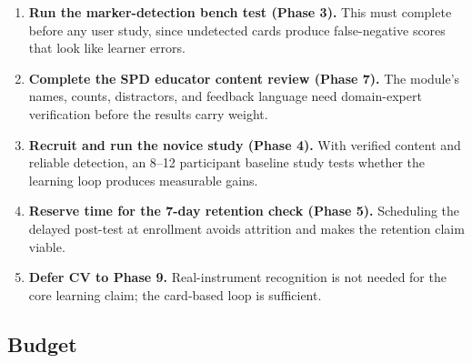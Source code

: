 \documentclass[10pt,a4paper]{article}
\begin{document}
\begin{enumerate}
  \item \textbf{Run the marker-detection bench test (Phase 3).} This must complete before any user study, since undetected cards produce false-negative scores that look like learner errors.
  \item \textbf{Complete the SPD educator content review (Phase 7).} The module's names, counts, distractors, and feedback language need domain-expert verification before the results carry weight.
  \item \textbf{Recruit and run the novice study (Phase 4).} With verified content and reliable detection, an 8--12 participant baseline study tests whether the learning loop produces measurable gains.
  \item \textbf{Reserve time for the 7-day retention check (Phase 5).} Scheduling the delayed post-test at enrollment avoids attrition and makes the retention claim viable.
  \item \textbf{Defer CV to Phase 9.} Real-instrument recognition is not needed for the core learning claim; the card-based loop is sufficient.
\end{enumerate}

\subsection{Budget}
\end{document}
